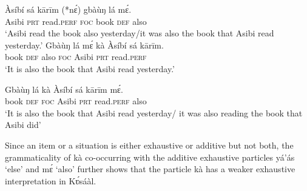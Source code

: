 \documentclass[output=paper
,newtxmath
,modfonts
,nonflat]{langsci/langscibook}
\begin{document}
\ea\label{ex:abubakari:34}
\gll Àsíbí		sá	kārīm		(*nɛ́)	gbàùŋ	lá	mɛ́.\\
Asibi	\textsc{prt}	read.\textsc{perf}	\textsc{foc}	book	\textsc{def} also\\
\glt ‘Asibi read the book also yesterday/it was also the book       
                       that Asibi read yesterday.’
\z
\ea\label{ex:abubakari:35}
\gll	Gbàùŋ	lá	mɛ́	kà	Àsíbí	sá	kārīm.\\
book		\textsc{def}	also	\textsc{foc}	Asibi	\textsc{prt}	read.\textsc{perf}\\
\glt ‘It is also the book that Asibi read yesterday.’
\z

\ea\label{ex:abubakari:36}
\gll Gbàùŋ	lá	kà	Àsíbí	sá	kārīm	mɛ́.\\	
book	\textsc{def}	\textsc{foc}	Asibi	\textsc{prt}	read.\textsc{perf}	also\\
\glt ‘It is also the book that Asibi read yesterday/ it was also reading the book that Asibi did’
\z

Since an item or a situation is either exhaustive or additive but not both, the grammaticality of kà co-occurring with the additive exhaustive particles yá’ás ‘else’ and mɛ́ ‘also’ further shows that the particle kà has a weaker exhaustive  interpretation in Kʋ́sáàl. 
\end{document}
